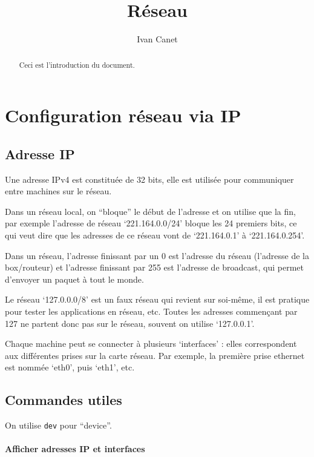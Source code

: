 \documentclass[10pt,a4paper,french]{article}
\begin{document}
\title{Réseau}
\author{Ivan Canet}
\maketitle

\begin{abstract}
Ceci est l'introduction du document.
\end{abstract}
\tableofcontents

\section{Configuration réseau via IP}

\subsection{Adresse IP}

Une adresse IPv4 est constituée de 32 bits, elle est utilisée pour communiquer entre machines sur le réseau.

Dans un réseau local, on ``bloque'' le début de l'adresse et on utilise que la fin, par exemple l'adresse de réseau `221.164.0.0/24' bloque les 24 premiers bits, ce qui veut dire que les adresses de ce réseau vont de `221.164.0.1' à `221.164.0.254'.

Dans un réseau, l'adresse finissant par un 0 est l'adresse du réseau (l'adresse de la box/routeur) et l'adresse finissant par 255 est l'adresse de broadcast, qui permet d'envoyer un paquet à tout le monde.

Le réseau `127.0.0.0/8' est un faux réseau qui revient sur soi-même, il est pratique pour tester les applications en réseau, etc. Toutes les adresses commençant par 127 ne partent donc pas sur le réseau, souvent on utilise `127.0.0.1'.

Chaque machine peut se connecter à plusieurs `interfaces' : elles correspondent aux différentes prises sur la carte réseau. Par exemple, la première prise ethernet est nommée `eth0', puis `eth1', etc.

\subsection{Commandes utiles}

On utilise {\tt dev} pour ``device''.

\paragraph{Afficher adresses IP et interfaces}
\end{document}
